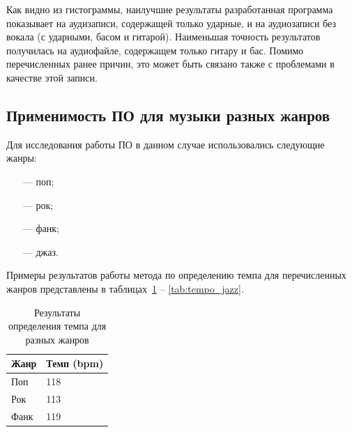 
Как видно из гистограммы, наилучшие результаты разработанная программа показывает на аудизаписи, содержащей только ударные, и на аудиозаписи без вокала (с ударными, басом и гитарой). Наименьшая точность результатов получилась на аудиофайле, содержащем только гитару и бас. Помимо перечисленных ранее причин, это может быть связано также с проблемами в качестве этой записи.

\newpage

\subsection{Применимость ПО для музыки разных жанров}

Для исследования работы ПО в данном случае использовались следующие жанры:

\begin{itemize}
	\item[---] поп;
	\item[---] рок;
	\item[---] фанк;
	\item[---] джаз.
\end{itemize}

Примеры результатов работы метода по определению темпа для перечисленных жанров представлены в таблицах~\ref{tab:tempo_genres} -- \ref{tab:tempo_jazz}.

\begin{table}[!h]
	\begin{center}
		\caption{\label{tab:tempo_genres}Результаты определения темпа для разных жанров}
		\begin{tabular}{|p{8cm}|p{8cm}|}
			\hline
			\textbf{Жанр} & \textbf{Темп (bpm)}\\
			\hline
			Поп & 118\\
			\hline
			Рок & 113\\
			\hline
			Фанк & 119\\
			\hline
		\end{tabular}
	\end{center}
\end{table}

